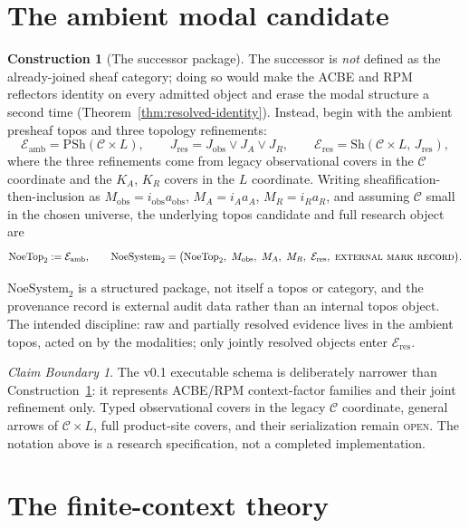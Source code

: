 \documentclass[11pt]{amsart}
\theoremstyle{definition}
\newtheorem{construction}[theorem]{Construction}
\theoremstyle{remark}
\newtheorem{boundary}[theorem]{Claim Boundary}
\newcommand{\PSh}{\mathrm{PSh}}
\newcommand{\Sh}{\mathrm{Sh}}
\newcommand{\Eamb}{\mathcal{E}_{\mathrm{amb}}}
\newcommand{\Eres}{\mathcal{E}_{\mathrm{res}}}
\newcommand{\cC}{\mathcal{C}}
\begin{document}
\section{The ambient modal candidate}\label{sec:ambient}

\begin{construction}[The successor package]\label{con:ambient}
The successor is \emph{not} defined as the already-joined sheaf category; doing so would make the ACBE and RPM reflectors identity on every admitted object and erase the modal structure a second time (Theorem~\ref{thm:resolved-identity}). Instead, begin with the ambient presheaf topos and three topology refinements:
\[
\Eamb=\PSh(\cC\times L),\qquad
J_{\mathrm{res}}=J_{\mathrm{obs}}\vee J_A\vee J_R,\qquad
\Eres=\Sh(\cC\times L,\,J_{\mathrm{res}}),
\]
where the three refinements come from legacy observational covers in the $\cC$ coordinate and the $K_A$, $K_R$ covers in the $L$ coordinate. Writing sheafification-then-inclusion as $M_{\mathrm{obs}}=i_{\mathrm{obs}}a_{\mathrm{obs}}$, $M_A=i_Aa_A$, $M_R=i_Ra_R$, and assuming $\cC$ small in the chosen universe, the underlying topos candidate and full research object are
\[
\mathrm{NoeTop}_2:=\Eamb,\qquad
\mathrm{NoeSystem}_2=\bigl(\mathrm{NoeTop}_2,\ M_{\mathrm{obs}},\ M_A,\ M_R,\ \Eres,\ \textsc{external mark record}\bigr).
\]
\end{construction}

$\mathrm{NoeSystem}_2$ is a structured package, not itself a topos or category, and the provenance record is external audit data rather than an internal topos object. The intended discipline: raw and partially resolved evidence lives in the ambient topos, acted on by the modalities; only jointly resolved objects enter $\Eres$.

\begin{boundary}
The v0.1 executable schema is deliberately narrower than Construction~\ref{con:ambient}: it represents ACBE/RPM context-factor families and their joint refinement only. Typed observational covers in the legacy $\cC$ coordinate, general arrows of $\cC\times L$, full product-site covers, and their serialization remain \textsc{open}. The notation above is a research specification, not a completed implementation.
\end{boundary}

\section{The finite-context theory}\label{sec:theorems}
\end{document}
